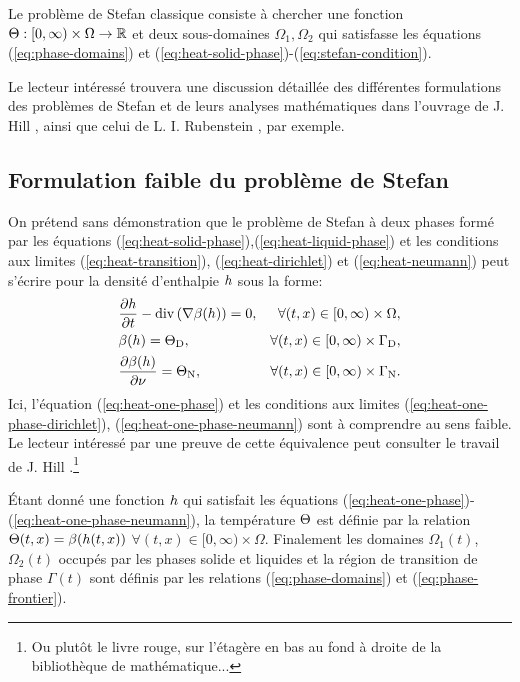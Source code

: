 Le problème de Stefan classique consiste à chercher une fonction
$\Theta:[0,\infty)\times\Omega\to\mathbb R$ et deux
sous-domaines $\Omega_1,\Omega_2$ qui satisfasse les équations
(\ref{eq:phase-domains}) et
(\ref{eq:heat-solid-phase})-(\ref{eq:stefan-condition}).

Le lecteur intéressé trouvera une discussion détaillée des différentes
formulations des problèmes de Stefan et de leurs analyses mathématiques
dans l'ouvrage de J. Hill \cite{HillStefanProblems}, ainsi que celui
de L. I. Rubenstein \cite{Rubenstein1971}, par exemple.

\subsection*{Formulation faible du problème de Stefan}
On prétend sans démonstration que le problème de Stefan à deux phases
formé par les équations
(\ref{eq:heat-solid-phase}),(\ref{eq:heat-liquid-phase}) et les
conditions aux limites (\ref{eq:heat-transition}),
(\ref{eq:heat-dirichlet}) et (\ref{eq:heat-neumann}) peut s'écrire
pour la densité d'enthalpie $h$ sous la forme:
\begin{align}
  & \frac{\partial \enthalpydensity}{\partial t} %
  - \div\parent{ \nabla \beta(\enthalpydensity)} = 0,%
  & \forall (t, x) \in [0,\infty)\times \Omega,\label{eq:heat-one-phase}\\
  & \beta(\enthalpydensity) = \temperature_\mathrm{D}, %
  & \forall (t, x) \in [0,\infty)\times \Gamma_\mathrm{D},\label{eq:heat-one-phase-dirichlet}\\
  & \frac{\partial \beta(\enthalpydensity)}{\partial \nu} = \temperature_\mathrm{N}, %
  & \forall (t, x) \in [0,\infty)\times \Gamma_\mathrm{N}.\label{eq:heat-one-phase-neumann}
\end{align}
Ici, l'équation (\ref{eq:heat-one-phase}) et les conditions aux
limites (\ref{eq:heat-one-phase-dirichlet}),
(\ref{eq:heat-one-phase-neumann}) sont à comprendre au sens faible. Le
lecteur intéressé par une preuve de cette équivalence peut consulter
le travail de J. Hill \cite{HillStefanProblems}.\footnote{Ou plutôt le
livre rouge, sur l'étagère en bas au fond à droite de la
bibliothèque de mathématique...}

Étant donné une fonction $h$ qui satisfait les
équations (\ref{eq:heat-one-phase})-(\ref{eq:heat-one-phase-neumann}),
la température $\Theta$ est définie par la relation
$\Theta(t, x) = \beta(h(t, x))$ $\forall (t, x)
\in [0,\infty)\times\Omega$. Finalement les domaines $\Omega_1(t)$,
$\Omega_2(t)$ occupés par les phases solide et liquides et la région
de transition de phase $\Gamma(t)$ sont définis par les relations
(\ref{eq:phase-domains}) et (\ref{eq:phase-frontier}).


